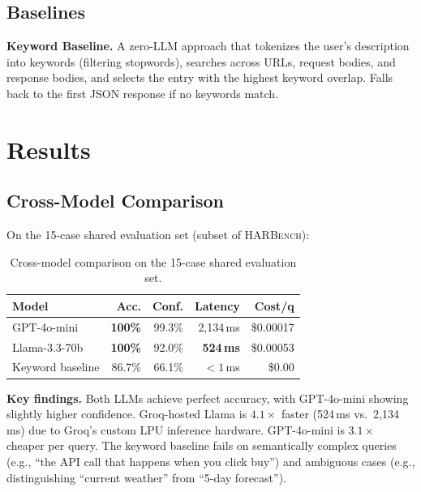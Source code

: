 \documentclass[10pt,twocolumn]{article}
\begin{document}
\subsection{Baselines}

\textbf{Keyword Baseline.} A zero-LLM approach that tokenizes the user's description into keywords (filtering stopwords), searches across URLs, request bodies, and response bodies, and selects the entry with the highest keyword overlap. Falls back to the first JSON response if no keywords match.

\section{Results}
\label{sec:results}

\subsection{Cross-Model Comparison}

On the 15-case shared evaluation set (subset of \textsc{HARBench}):

\begin{table}[H]
\centering
\caption{Cross-model comparison on the 15-case shared evaluation set.}
\label{tab:crossmodel}
\scriptsize
\begin{tabularx}{\columnwidth}{@{}l r r r r@{}}
\toprule
\textbf{Model} & \textbf{Acc.} & \textbf{Conf.} & \textbf{Latency} & \textbf{Cost/q} \\
\midrule
GPT-4o-mini     & \textbf{100\%} & 99.3\%  & 2,134\,ms & \$0.00017 \\
Llama-3.3-70b   & \textbf{100\%} & 92.0\%  & \textbf{524\,ms}  & \$0.00053 \\
Keyword baseline & 86.7\%        & 66.1\%  & ${<}1$\,ms         & \$0.00    \\
\bottomrule
\end{tabularx}
\end{table}

\textbf{Key findings.} Both LLMs achieve perfect accuracy, with GPT-4o-mini showing slightly higher confidence. Groq-hosted Llama is $4.1\times$ faster (524\,ms vs.\ 2,134\,ms) due to Groq's custom LPU inference hardware. GPT-4o-mini is $3.1\times$ cheaper per query. The keyword baseline fails on semantically complex queries (e.g., ``the API call that happens when you click buy'') and ambiguous cases (e.g., distinguishing ``current weather'' from ``5-day forecast'').
\end{document}

